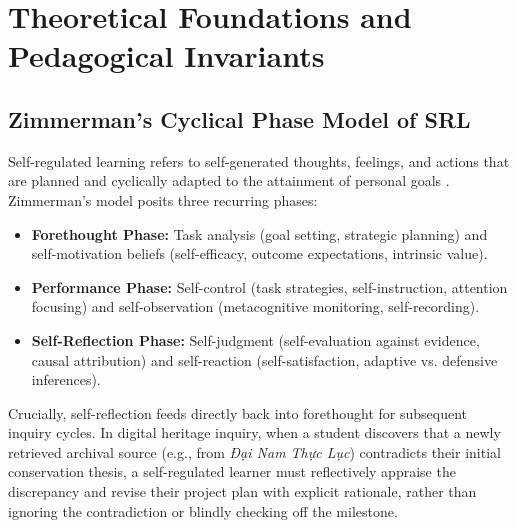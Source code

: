 \documentclass[11pt,a4paper]{article}
\begin{document}
\section{Theoretical Foundations and Pedagogical Invariants}

\subsection{Zimmerman's Cyclical Phase Model of SRL}
Self-regulated learning refers to self-generated thoughts, feelings, and actions that are planned and cyclically adapted to the attainment of personal goals \cite{zimmerman2000attaining}. Zimmerman's model posits three recurring phases:
\begin{itemize}
    \item \textbf{Forethought Phase:} Task analysis (goal setting, strategic planning) and self-motivation beliefs (self-efficacy, outcome expectations, intrinsic value).
    \item \textbf{Performance Phase:} Self-control (task strategies, self-instruction, attention focusing) and self-observation (metacognitive monitoring, self-recording).
    \item \textbf{Self-Reflection Phase:} Self-judgment (self-evaluation against evidence, causal attribution) and self-reaction (self-satisfaction, adaptive vs. defensive inferences).
\end{itemize}

Crucially, self-reflection feeds directly back into forethought for subsequent inquiry cycles. In digital heritage inquiry, when a student discovers that a newly retrieved archival source (e.g., from \textit{Đại Nam Thực Lục}) contradicts their initial conservation thesis, a self-regulated learner must reflectively appraise the discrepancy and revise their project plan with explicit rationale, rather than ignoring the contradiction or blindly checking off the milestone.
\end{document}
